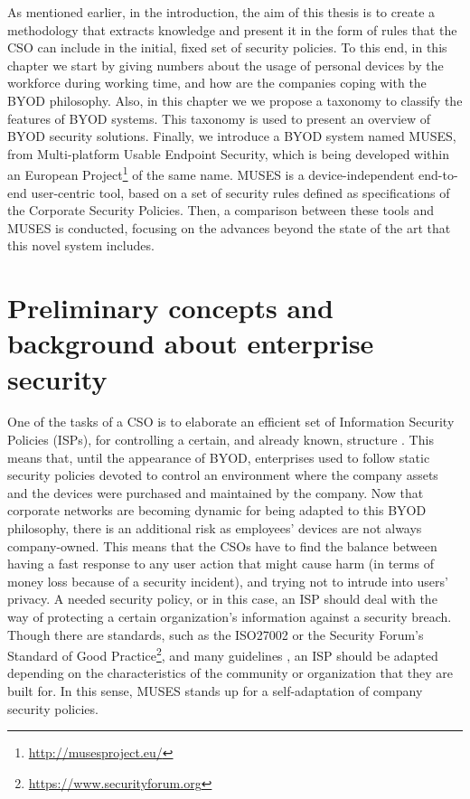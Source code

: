 As mentioned earlier, in the introduction, the aim of this thesis is to create a methodology that extracts knowledge and present it in the form of rules that the CSO can include in the initial, fixed set of security policies. To this end, in this chapter we start by giving numbers about the usage of personal devices by the workforce during working time, and how are the companies coping with the BYOD philosophy. Also, in this chapter we we propose a taxonomy to classify the features of BYOD systems. This taxonomy is used to present an overview of BYOD security solutions. Finally, we introduce a BYOD system named MUSES, from Multi-platform Usable Endpoint Security, which is being developed within an European Project\footnote{\url{http://musesproject.eu/}} of the same name. MUSES is a dev\-ice\--in\-de\-pen\-dent end-to-end user-centric tool, based on a set of security rules defined as specifications of the Corporate Security Policies. Then, a comparison between these tools and MUSES is conducted, focusing on the advances beyond the state of the art that this novel system includes.

\section{Preliminary concepts and background about enterprise security}
\label{sec:preliminaryconcepts}

One of the tasks of a CSO is to elaborate an efficient set of Information Security Policies (ISPs), for controlling a certain, and already known, structure \cite{Opp_Security11}. This means that, until the appearance of BYOD, enterprises used to follow static security policies devoted to control an environment where the company assets and the devices were purchased and maintained by the company. Now that corporate networks are becoming dynamic for being adapted to this BYOD philosophy, there is an additional risk as employees' devices are not always company-owned. This means that the CSOs have to find the balance between having a fast response to any user action that might cause harm (in terms of money loss because of a security incident), and trying not to intrude into users' privacy. %
A needed security policy, or in this case, an ISP should deal with the way of protecting a certain organization's information against a security breach. Though there are standards, such as the ISO27002 or the Security Forum's Standard of Good Practice\footnote{\url{https://www.securityforum.org}}, and many guidelines \cite{SecPol09}, an ISP should be adapted depending on the characteristics of the community or organization that they are built for. In this sense, MUSES stands up for a self-adaptation of company security policies.

